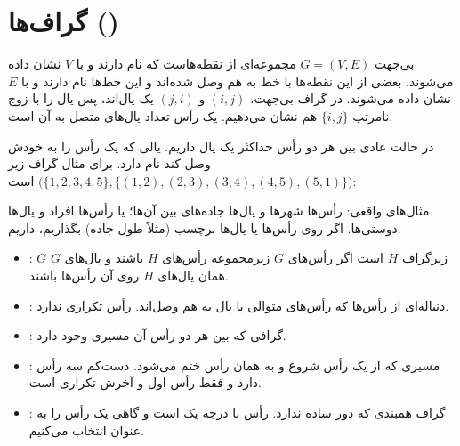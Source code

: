 \section{گراف‌ها ()}

\begin{definition}[گراف]
 بی‌جهت $G=(V,E)$ مجموعه‌ای از نقطه‌هاست که  نام دارند و با $V$ نشان داده می‌شوند. بعضی از این نقطه‌ها با خط به هم وصل شده‌اند و این خط‌ها  نام دارند و با $E$ نشان داده می‌شوند. در گراف بی‌جهت، $(i,j)$ و $(j,i)$ یک یال‌اند، پس یال را با زوج نامرتب $\{i,j\}$ هم نشان می‌دهیم.  یک رأس تعداد یال‌های متصل به آن است.
\end{definition}

در حالت عادی بین هر دو رأس حداکثر یک یال داریم. یالی که یک رأس را به خودش وصل کند  نام دارد. برای مثال گراف زیر $\big(\{1,2,3,4,5\},\{(1,2),(2,3),(3,4),(4,5),(5,1)\}\big)$ است:

\begin{ltrfig}
\end{ltrfig}

مثال‌های واقعی: رأس‌ها شهرها و یال‌ها جاده‌های بین آن‌ها؛ یا رأس‌ها افراد و یال‌ها دوستی‌ها. اگر روی رأس‌ها یا یال‌ها برچسب (مثلاً طول جاده) بگذاریم،  داریم.

\begin{definition}
\begin{itemize}
\item {}: $G$ زیرگراف $H$ است اگر رأس‌های $G$ زیرمجموعه رأس‌های $H$ باشند و یال‌های $G$ همان یال‌های $H$ روی آن رأس‌ها باشند.
\item {}: دنباله‌ای از رأس‌ها که رأس‌های متوالی با یال به هم وصل‌اند.  رأس تکراری ندارد.
\item {}: گرافی که بین هر دو رأس آن مسیری وجود دارد.
\item {}: مسیری که از یک رأس شروع و به همان رأس ختم می‌شود.  دست‌کم سه رأس دارد و فقط رأس اول و آخرش تکراری است.
\item {}: گراف همبندی که دور ساده ندارد. رأس با درجه یک  است و گاهی یک رأس را به عنوان  انتخاب می‌کنیم.
\end{itemize}
\end{definition}

